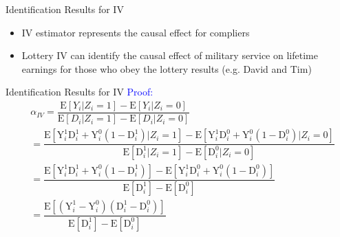 \documentclass[dvipsnames,hyperref={pdfpagelabels=false}]{beamer}
\begin{document}
\begin{frame}{Identification Results for IV}
	\begin{itemize}
		
		\begin{block}{IV Identify LATE}
			\begin{equation*}
			\alpha_{IV}=\dfrac{\mathrm{E}[Y_{i}|Z_{i}=1]-\mathrm{E}[Y_{i}|Z_{i}=0]}{\mathrm{E}[D_{i}|Z_{i}=1]-\mathrm{E}[D_{i}|Z_{i}=0]} 
			= \mathrm{E}[ \mathrm{Y}^{1}_{i} - \mathrm{Y}^{0}_{i} | \mathrm{D}^{1}_{i} > \mathrm{D}^{0}_{i}]
			\end{equation*} 
		\end{block}
		
		\item IV estimator represents the causal effect for compliers
		\vspace{0.2cm}
		\item Lottery IV can identify the causal effect of military service on lifetime earnings for those who obey the lottery results (e.g. David and Tim)
	\end{itemize}
\end{frame}



\begin{frame}{Identification Results for IV}
	\textcolor{blue}{Proof:}
	\begin{equation*}
		\begin{aligned}
			&\alpha_{IV}=\dfrac{\mathrm{E}[Y_{i}|Z_{i}=1]-\mathrm{E}[Y_{i}|Z_{i}=0]}{\mathrm{E}[D_{i}|Z_{i}=1]-\mathrm{E}[D_{i}|Z_{i}=0]}  \\
			&= \dfrac{\mathrm{E}[\mathrm{Y}^{1}_{i} \mathrm{D}^{1}_{i}+\mathrm{Y}^{0}_{i}(1-\mathrm{D}^{1}_{i})|Z_{i}=1]-\mathrm{E}[\mathrm{Y}^{1}_{i} \mathrm{D}^{0}_{i}+\mathrm{Y}^{0}_{i} (1-\mathrm{D}^{0}_{i})|Z_{i}=0]}{\mathrm{E}[\mathrm{D}^{1}_{i}|Z_{i}=1]-\mathrm{E}[\mathrm{D}^{0}_{i}|Z_{i}=0]}  \\
			&= \dfrac{\mathrm{E}[\mathrm{Y}^{1}_{i} \mathrm{D}^{1}_{i}+\mathrm{Y}^{0}_{i}(1-\mathrm{D}^{1}_{i})]-\mathrm{E}[\mathrm{Y}^{1}_{i} \mathrm{D}^{0}_{i}+\mathrm{Y}^{0}_{i}(1-\mathrm{D}^{0}_{i})]}{\mathrm{E}[\mathrm{D}^{1}_{i}]-\mathrm{E}[\mathrm{D}^{0}_{i}]}\\
			&= \dfrac{\mathrm{E}[(\mathrm{Y}^{1}_{i}-\mathrm{Y}^{0}_{i})(\mathrm{D}^{1}_{i}-\mathrm{D}^{0}_{i})]}{\mathrm{E}[\mathrm{D}^{1}_{i}]-\mathrm{E}[\mathrm{D}^{0}_{i}]}
		\end{aligned}
	\end{equation*}
\end{frame}
\end{document}
